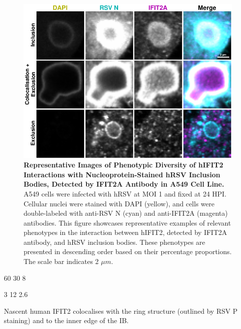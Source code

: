 \begin{figure}
    \centering
    \includegraphics[width=1\linewidth]{08. Chapter 3/Figs/02. Infection/02. IFIT2/01. IFIT2A/03. i2a a549 hrsv n.pdf}
    \caption[Representative Images of Phenotypic Diversity of hIFIT2 Interactions with Nucleoprotein-Stained hRSV Inclusion Bodies, Detected by IFIT2A Antibody in A549 Cell Line.]{\textbf{Representative Images of Phenotypic Diversity of hIFIT2 Interactions with Nucleoprotein-Stained hRSV Inclusion Bodies, Detected by IFIT2A Antibody in A549 Cell Line.} A549 cells were infected with hRSV at MOI 1 and fixed at 24 HPI. Cellular nuclei were stained with DAPI (yellow), and cells were double-labeled with anti-RSV N (cyan) and anti-IFIT2A (magenta) antibodies. This figure showcases representative examples of relevant phenotypes in the interaction between hIFIT2, detected by IFIT2A antibody, and hRSV inclusion bodies. These phenotypes are presented in descending order based on their percentage proportions. The scale bar indicates 2 \(\mu m\).}
    \label{fig:Representative Images of Phenotypic Diversity of hIFIT2 Interactions with Nucleoprotein-Stained hRSV Inclusion Bodies, Detected by IFIT2A Antibody in A549 Cell Line}
\end{figure}

60 30 8

3 12 2.6

Nascent human IFIT2 colocalises with the ring structure (outlined by RSV P staining) and to the inner edge of the IB.

